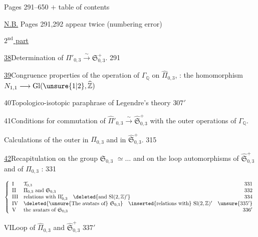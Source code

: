 
Pages 291--650 $+$ table of contents

\uline{N.B.} Pages 291,292 appear twice
(numbering error)


\uline{$2^{\text{nd}}$ part}\quad
{}

\uline{38}\quad Determination of
$\Pi'_{0,3}\xrightarrow{\sim}\mathfrak S_{0,3}^{+}$.
\hfill 291

\uline{39}\quad Congruence properties of the operation
of $\Gamma_{\mathbb Q}$ on $\widehat{\Pi}_{0,3}$,
 : the homomorphism
$N_{1,1}\longrightarrow \mathrm{Gl}(\unsure{1|2},\widehat{\mathbb Z})$
\hfill {}

40\quad Topologico-isotopic paraphrase of
Legendre's theory
\hfill $307'$

41\quad Conditions for commutation of
$\widehat{\Pi}'_{0,3}\xrightarrow{\sim}\widehat{\mathfrak S}_{0,3}^{+}$
with the outer operations of $\Gamma_{\mathbb Q}$.
\hfill {}

Calculations of the outer  in $\widehat{\Pi}_{0,3}$ and
in $\widehat{\mathfrak S}_{0,3}^{+}$.
\hfill 315

\uline{42}\quad Recapitulation on the group
$\mathfrak S_{0,3}$
$\simeq\ldots$ and on the loop automorphisms of
$\widehat{\mathfrak S}_{0,3}^{+}$ and of
$\widehat{\Pi}_{0,3}$ :
\hfill 331

\[
\left\{
\begin{array}{llr}
\mathrm{I}&\mathcal T_{0,3}&331\\
\mathrm{II}&\Pi_{0,3}\text{ and }\mathfrak S_{0,3}&332\\
\mathrm{III}&\text{relations with }\Pi'_{0,3}\quad
\deleted{\text{and }\mathrm{Sl}(2,\mathbb Z)'}&334\\
\mathrm{IV}&\deleted{\text{\unsure{The avatars of}}\ \mathfrak S_{0,3}}\quad
\inserted{\text{relations with}}\ \mathrm{Sl}(2,\mathbb Z)'&\unsure{335'}\\
\mathrm{V}&\text{the avatars of }\mathfrak S_{0,3}&336'
\end{array}
\right.
\]

VI\quad Loop  of $\widehat{\Pi}_{0,3}$ and
$\widehat{\mathfrak S}_{0,3}^{+}$
\hfill $337'$

